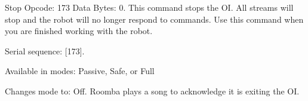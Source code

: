 \begin{Desc}
\begin{description}
\begin{DoxyItemize}
\end{DoxyItemize}\item[{\em 
\hypertarget{group__roomba-lib_gga305e17dfb7050ad83ea49ded2e6a2e24a4c60272718e8bd851c58e6a9545f0d9f}{}R\+O\+O\+M\+B\+A\+\_\+\+S\+T\+O\+P\label{group__roomba-lib_gga305e17dfb7050ad83ea49ded2e6a2e24a4c60272718e8bd851c58e6a9545f0d9f}
}]Stop Opcode\+: 173 Data Bytes\+: 0. This command stops the O\+I. All streams will stop and the robot will no longer respond to commands. Use this command when you are finished working with the robot.
\begin{DoxyItemize}
\item Serial sequence\+: \mbox{[}173\mbox{]}.
\item Available in modes\+: Passive, Safe, or Full
\item Changes mode to\+: Off. Roomba plays a song to acknowledge it is exiting the O\+I. 
\end{DoxyItemize}\end{description}
\end{Desc}


